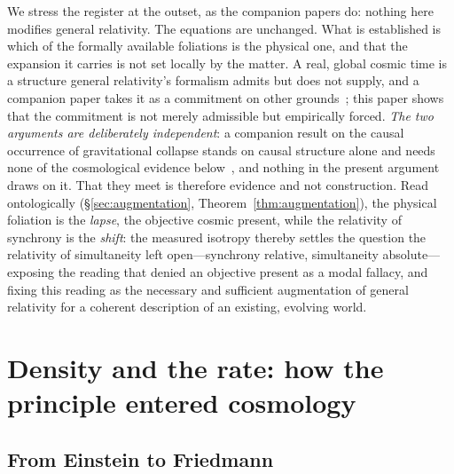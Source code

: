 \documentclass[11pt,a4paper]{article}
\begin{document}
We stress the register at the outset, as the companion papers do: nothing here modifies general relativity. The equations are unchanged. What is established is which of the formally available foliations is the physical one, and that the expansion it carries is not set locally by the matter. A real, global cosmic time is a structure general relativity's formalism admits but does not supply, and a companion paper takes it as a commitment on other grounds~\cite{JanzenCRframework}; this paper shows that the commitment is not merely admissible but empirically forced. \emph{The two arguments are deliberately independent}: a companion result on the causal occurrence of gravitational collapse stands on causal structure alone and needs none of the cosmological evidence below~\cite{JanzenBHcausality}, and nothing in the present argument draws on it. That they meet is therefore evidence and not construction. Read ontologically (\S\ref{sec:augmentation}, Theorem~\ref{thm:augmentation}), the physical foliation is the \emph{lapse}, the objective cosmic present, while the relativity of synchrony is the \emph{shift}: the measured isotropy thereby settles the question the relativity of simultaneity left open---synchrony relative, simultaneity absolute---exposing the reading that denied an objective present as a modal fallacy, and fixing this reading as the necessary and sufficient augmentation of general relativity for a coherent description of an existing, evolving world.

\section{Density and the rate: how the principle entered cosmology}\label{sec:principle}

\subsection{From Einstein to Friedmann}\label{sec:history}
\end{document}
